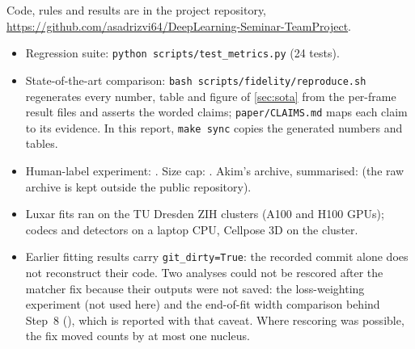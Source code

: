 Code, rules and results are in the project repository,\\
\url{https://github.com/asadrizvi64/DeepLearning-Seminar-TeamProject}.
\begin{itemize}
  \item Regression suite: \texttt{python scripts/test\_metrics.py} (24 tests).
  \item State-of-the-art comparison: \texttt{bash scripts/fidelity/reproduce.sh} regenerates every
    number, table and figure of \cref{sec:sota} from the per-frame result files and asserts the
    worded claims; \texttt{paper/CLAIMS.md} maps each claim to its evidence. In this report,
    \texttt{make sync} copies the generated numbers and tables.
  \item Human-label experiment: . Size cap:
    . Akim's archive, summarised:
     (the raw archive is kept outside the public
    repository).
  \item Luxar fits ran on the TU Dresden ZIH clusters (A100 and H100 GPUs); codecs and detectors
    on a laptop CPU, Cellpose 3D on the cluster.
  \item Earlier fitting results carry \texttt{git\_dirty=True}: the recorded commit alone does not
    reconstruct their code. Two analyses could not be rescored after the matcher fix because
    their outputs were not saved: the loss-weighting experiment (not used here) and the
    end-of-fit width comparison behind Step~8 (), which
    is reported with that caveat. Where rescoring was possible, the fix moved counts by at most
    one nucleus.
\end{itemize}
